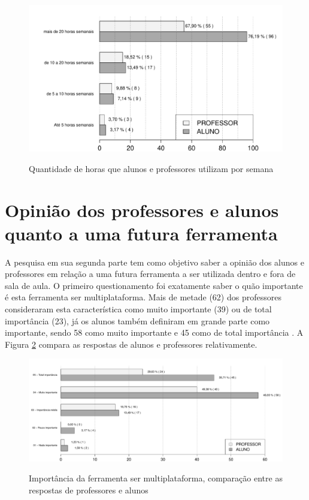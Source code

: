 \begin{figure}
\centering
\caption{Quantidade de horas que alunos e professores utilizam por semana}
\includegraphics[width=1.0\textwidth]{pdfs/alunos-professores/uso-internet.pdf} 
\label{fig:grafico_uso_internet} 
\end{figure}



\section{Opinião dos professores e alunos quanto a uma futura ferramenta}

A pesquisa em sua segunda parte tem como objetivo saber a opinião dos alunos e professores em relação a uma futura ferramenta a ser utilizada dentro e fora de sala de aula. O primeiro questionamento foi exatamente saber o quão importante é esta ferramenta ser multiplataforma. Mais de metade (62) dos professores consideraram esta característica como muito importante (39) ou de total importância (23), já os alunos também definiram em grande parte como importante, sendo 58 como muito importante e 45 como de total importância . A Figura \ref{fig:grafico_multiplataforma} compara as respostas de alunos e professores relativamente. 

\begin{figure}
\centering
\caption{Importância da ferramenta ser multiplataforma, comparação entre as respostas de professores e alunos}
\includegraphics[width=1.0\textwidth]{pdfs/alunos-professores/funcionalidades-multiplataforma2.pdf} 
\label{fig:grafico_multiplataforma} 
\end{figure}

